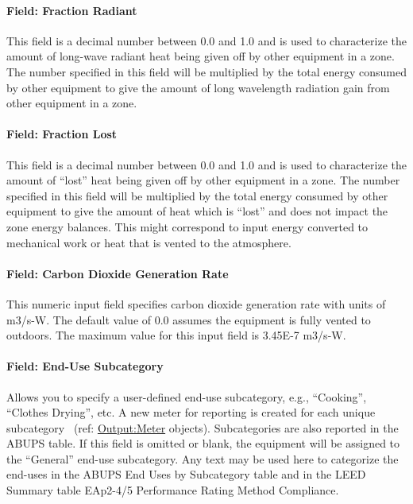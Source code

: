 \paragraph{Field: Fraction Radiant}\label{field-fraction-radiant-6}

This field is a decimal number between 0.0 and 1.0 and is used to characterize the amount of long-wave radiant heat being given off by other equipment in a zone. The number specified in this field will be multiplied by the total energy consumed by other equipment to give the amount of long wavelength radiation gain from other equipment in a zone.

\paragraph{Field: Fraction Lost}\label{field-fraction-lost-4}

This field is a decimal number between 0.0 and 1.0 and is used to characterize the amount of ``lost'' heat being given off by other equipment in a zone. The number specified in this field will be multiplied by the total energy consumed by other equipment to give the amount of heat which is ``lost'' and does not impact the zone energy balances. This might correspond to input energy converted to mechanical work or heat that is vented to the atmosphere.

\paragraph{Field: Carbon Dioxide Generation Rate}\label{field-carbon-dioxide-generation-rate-otherequip}

This numeric input field specifies carbon dioxide generation rate with units of m3/s-W. The default value of 0.0 assumes the equipment is fully vented to outdoors. The maximum value for this input field is 3.45E-7 m3/s-W.

\paragraph{Field: End-Use Subcategory}\label{field-end-use-subcategory-otherequip}

Allows you to specify a user-defined end-use subcategory, e.g., ``Cooking'', ``Clothes Drying'', etc. A new meter for reporting is created for each unique subcategory~ (ref: \hyperref[outputmeter-and-outputmetermeterfileonly]{Output:Meter} objects). Subcategories are also reported in the ABUPS table. If this field is omitted or blank, the equipment will be assigned to the ``General'' end-use subcategory. Any text may be used here to categorize the end-uses in the ABUPS End Uses by Subcategory table and in the LEED Summary table EAp2-4/5 Performance Rating Method Compliance.


